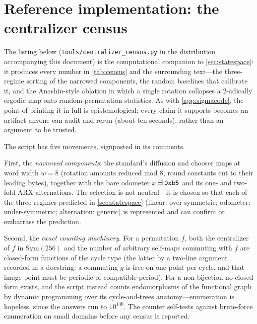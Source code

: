 \section{Reference implementation: the centralizer census}
\label{app:censuscode}

The listing below (\texttt{tools/centralizer\_census.py} in the
distribution accompanying this document) is the computational companion
to \cref{sec:statespace}: it produces every number in \cref{tab:census}
and the surrounding text---the three-regime sorting of the narrowed
components, the random baselines that calibrate it, and the
Anashin-style ablation in which a single rotation collapses a
$2$-adically ergodic map onto random-permutation statistics. As with
\cref{app:sigmacode}, the point of printing it in full is
epistemological: every claim it supports becomes an artifact anyone
can audit and rerun (about ten seconds), rather than an argument to be
trusted.

The script has five movements, signposted in its comments.

First, the \emph{narrowed components}: the standard's diffusion and
chooser maps at word width $w = 8$ (rotation amounts reduced mod $8$,
round constants cut to their leading bytes), together with the bare
odometer $x \boxplus \mathtt{0xb5}$ and its one- and two-fold ARX
alternations. The selection is not neutral---it is chosen so that each
of the three regimes predicted in \cref{sec:statespace} (linear:
over-symmetric; odometer: under-symmetric; alternation: generic) is
represented and can confirm or embarrass the prediction.

Second, the \emph{exact counting machinery}. For a permutation $f$,
both the centralizer of $f$ in $\mathrm{Sym}(256)$ and the number of
arbitrary self-maps commuting with $f$ are closed-form functions of
the cycle type (the latter by a two-line argument recorded in a
docstring: a commuting $g$ is free on one point per cycle, and that
image point must be periodic of compatible period). For a
non-bijection no closed form exists, and the script instead counts
endomorphisms of the functional graph by dynamic programming over its
cycle-and-trees anatomy---enumeration is hopeless, since the answers
run to $10^{140}$. The counter self-tests against brute-force
enumeration on small domains before any census is reported.

